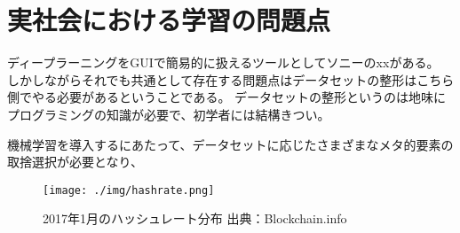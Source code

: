 \section{実社会における学習の問題点}
ディープラーニングをGUIで簡易的に扱えるツールとしてソニーのxxがある。
しかしながらそれでも共通として存在する問題点はデータセットの整形はこちら側でやる必要があるということである。
データセットの整形というのは地味にプログラミングの知識が必要で、初学者には結構きつい。

機械学習を導入するにあたって、データセットに応じたさまざまなメタ的要素の取捨選択が必要となり、

\begin{figure}[h]
    \begin{center}
        \texttt{[image: ./img/hashrate.png]}
        \caption{2017年1月のハッシュレート分布 出典：Blockchain.info\cite{bitcoinhashrate}}
        \label{img:hashrate}
    \end{center}
\end{figure}
\fi
